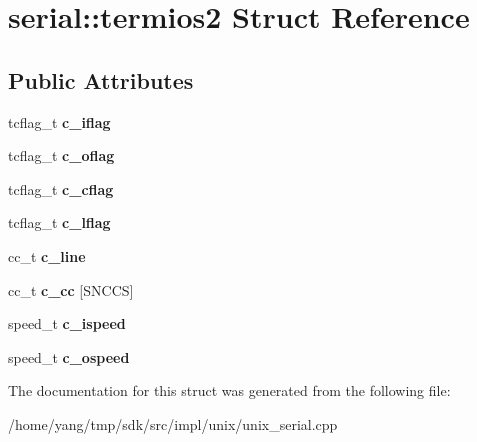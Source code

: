 \hypertarget{structserial_1_1termios2}{}\section{serial\+:\+:termios2 Struct Reference}
\label{structserial_1_1termios2}
\subsection*{Public Attributes}
\begin{DoxyCompactItemize}
\item 
tcflag\+\_\+t {\bfseries c\+\_\+iflag}\hypertarget{structserial_1_1termios2_ae6baf1fecdaf609fb72ebe3eb6a9f5df}{}\label{structserial_1_1termios2_ae6baf1fecdaf609fb72ebe3eb6a9f5df}

\item 
tcflag\+\_\+t {\bfseries c\+\_\+oflag}\hypertarget{structserial_1_1termios2_a179cf143410e65d4894b04cbf07b0fae}{}\label{structserial_1_1termios2_a179cf143410e65d4894b04cbf07b0fae}

\item 
tcflag\+\_\+t {\bfseries c\+\_\+cflag}\hypertarget{structserial_1_1termios2_a4e4ef81dbd8e793984861e7c43017501}{}\label{structserial_1_1termios2_a4e4ef81dbd8e793984861e7c43017501}

\item 
tcflag\+\_\+t {\bfseries c\+\_\+lflag}\hypertarget{structserial_1_1termios2_a21f1eeb4a15670a3aa89511d1c0d5e75}{}\label{structserial_1_1termios2_a21f1eeb4a15670a3aa89511d1c0d5e75}

\item 
cc\+\_\+t {\bfseries c\+\_\+line}\hypertarget{structserial_1_1termios2_aceccc8c95db1db715fa5aea6dae924b1}{}\label{structserial_1_1termios2_aceccc8c95db1db715fa5aea6dae924b1}

\item 
cc\+\_\+t {\bfseries c\+\_\+cc} \mbox{[}S\+N\+C\+CS\mbox{]}\hypertarget{structserial_1_1termios2_a672ff09c68b844014e24d9c046fc147c}{}\label{structserial_1_1termios2_a672ff09c68b844014e24d9c046fc147c}

\item 
speed\+\_\+t {\bfseries c\+\_\+ispeed}\hypertarget{structserial_1_1termios2_a87f2c161b7e83496ee16412e3c571b65}{}\label{structserial_1_1termios2_a87f2c161b7e83496ee16412e3c571b65}

\item 
speed\+\_\+t {\bfseries c\+\_\+ospeed}\hypertarget{structserial_1_1termios2_a995642a6dbe875dc7ca8eacd0c515098}{}\label{structserial_1_1termios2_a995642a6dbe875dc7ca8eacd0c515098}

\end{DoxyCompactItemize}


The documentation for this struct was generated from the following file\+:\begin{DoxyCompactItemize}
\item 
/home/yang/tmp/sdk/src/impl/unix/unix\+\_\+serial.\+cpp\end{DoxyCompactItemize}
